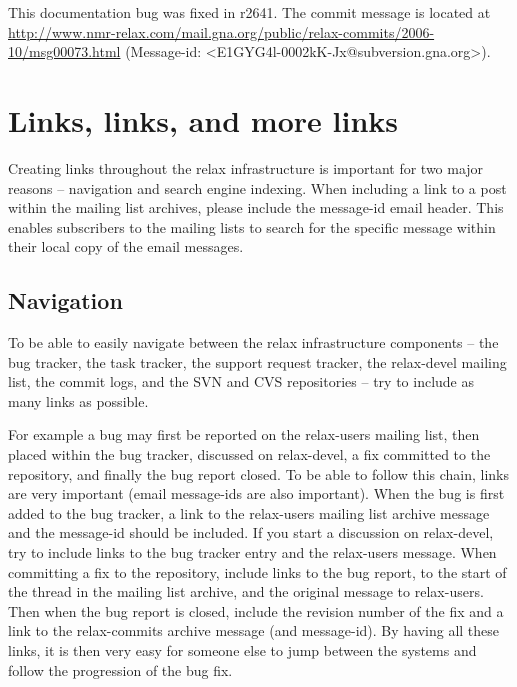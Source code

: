 \begin{exampleenv}
This documentation bug was fixed in r2641. The commit message is located at \href{http://www.nmr-relax.com/mail.gna.org/public/relax-commits/2006-10/msg00073.html}{http://www.nmr-relax.com/mail.gna.org/public/relax-commits/2006-10/msg00073.html} (Message-id: <E1GYG4l-0002kK-Jx@subversion.gna.org>).
\end{exampleenv}




\section{Links, links, and more links}

Creating links throughout the relax infrastructure is important for two major reasons -- navigation and search engine indexing.
When including a link to a post within the mailing list archives, please include the message-id email header.
This enables subscribers to the mailing lists to search for the specific message within their local copy of the email messages.



\subsection{Navigation}

To be able to easily navigate between the relax infrastructure components -- the bug tracker, the task tracker, the support request tracker, the relax-devel mailing list, the commit logs, and the SVN and CVS repositories -- try to include as many links as possible.

For example a bug may first be reported on the relax-users mailing list, then placed within the bug tracker, discussed on relax-devel, a fix committed to the repository, and finally the bug report closed.
To be able to follow this chain, links are very important (email message-ids are also important).
When the bug is first added to the bug tracker, a link to the relax-users mailing list archive message and the message-id should be included.
If you start a discussion on relax-devel, try to include links to the bug tracker entry and the relax-users message.
When committing a fix to the repository, include links to the bug report, to the start of the thread in the mailing list archive, and the original message to relax-users.
Then when the bug report is closed, include the revision number of the fix and a link to the relax-commits archive message (and message-id).
By having all these links, it is then very easy for someone else to jump between the systems and follow the progression of the bug fix.

